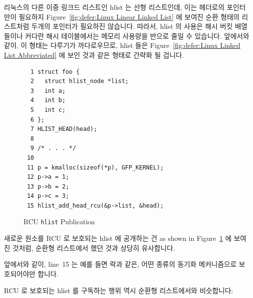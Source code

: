 리눅스의 다른 이중 링크드 리스트인 hlist 는 선형 리스트인데, 이는 헤더로의
포인터만이 필요하지
Figure~\ref{fig:defer:Linux Linear Linked List} 에 보여진 순환 형태의
리스트처럼 두개의 포인터가 필요하진 않습니다.
따라서, hlist 의 사용은 해시 버킷 배열들이나 커다란 해시 테이블에서는 메모리
사용량을 반으로 줄일 수 있습니다.
앞에서와 같이, 이 형태는 다루기가 까다로우므로, hlist 들은
Figure~\ref{fig:defer:Linux Linked List Abbreviated} 에 보인 것과 같은 형태로
간략화 될 겁니다.

\begin{figure}[tbp]
{ \scriptsize
\begin{verbatim}
  1 struct foo {
  2   struct hlist_node *list;
  3   int a;
  4   int b;
  5   int c;
  6 };
  7 HLIST_HEAD(head);
  8
  9 /* . . . */
 10
 11 p = kmalloc(sizeof(*p), GFP_KERNEL);
 12 p->a = 1;
 13 p->b = 2;
 14 p->c = 3;
 15 hlist_add_head_rcu(&p->list, &head);
\end{verbatim}
}
\caption{RCU {\tt hlist} Publication}
\label{fig:defer:RCU hlist Publication}
\end{figure}

새로운 원소를 RCU 로 보호되는 hlist 에 공개하는 건
as shown in Figure~\ref{fig:defer:RCU hlist Publication} 에 보여진 것처럼,
순환형 리스트에서 했던 것과 상당히 유사합니다.

앞에서와 같이, line~15 는 예를 들면 락과 같은, 어떤 종류의 동기화 메커니즘으로
보호되어야만 합니다.

RCU 로 보호되는 hlist 를 구독하는 행위 역시 순환형 리스트에서와 비슷합니다:


